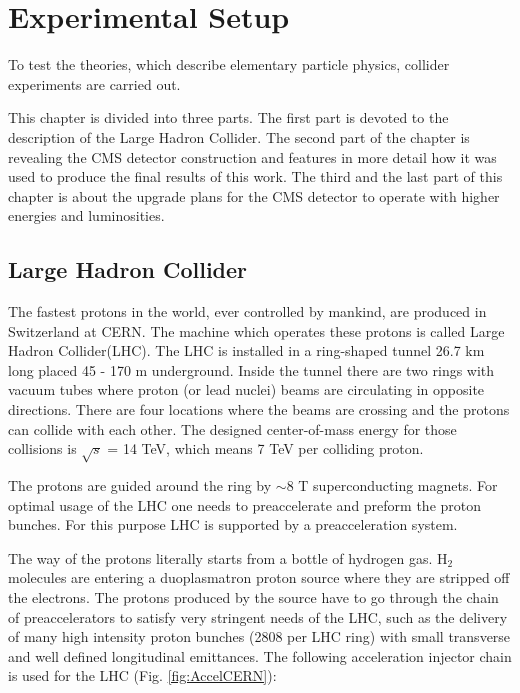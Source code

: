 \chapter{Experimental Setup}\label{chap:exp_setup}
To test the theories, which describe elementary particle physics, collider experiments are carried out. 

This chapter is divided into three parts.
The first part is devoted to the description of the Large Hadron Collider. The second part of the 
chapter is revealing the CMS detector construction and features in more detail how it was used to produce the final
results of this work. The third and the last part of this chapter is about the upgrade plans for the
CMS detector to operate with higher energies and luminosities.

\section{Large Hadron Collider}\label{sec:LHC}

The fastest protons in the world, ever controlled by mankind, are produced in Switzerland at CERN.
The machine which operates these protons is called Large Hadron Collider(LHC). 
The LHC is installed in a ring-shaped tunnel 26.7 km long  placed 45 - 170 m underground. 
Inside the tunnel there are two rings with vacuum tubes where proton (or lead nuclei) beams are circulating in opposite directions.
There are four locations where the beams are crossing and the protons can collide with each other. 
The designed center-of-mass energy for those collisions is $\sqrt{s}$ = 14 TeV, which means 7 TeV per colliding proton.

The protons are guided around the ring by $\sim$8 T superconducting magnets. 
For optimal usage of the LHC one needs to preaccelerate and preform the proton bunches.
For this purpose LHC is supported by a preacceleration system.


The way of the protons literally starts from a bottle of hydrogen gas.
H$_{2}$ molecules are entering a duoplasmatron proton source\cite{Scrivens:1382102} where they are stripped off the electrons. 
The protons produced by the source have to go through the chain of preaccelerators to satisfy very stringent needs of the LHC, such as 
the delivery of many high intensity proton bunches (2808 per LHC ring) with small transverse and well defined longitudinal emittances.
The following acceleration injector chain is used for the LHC (Fig. \ref{fig:AccelCERN}): 

